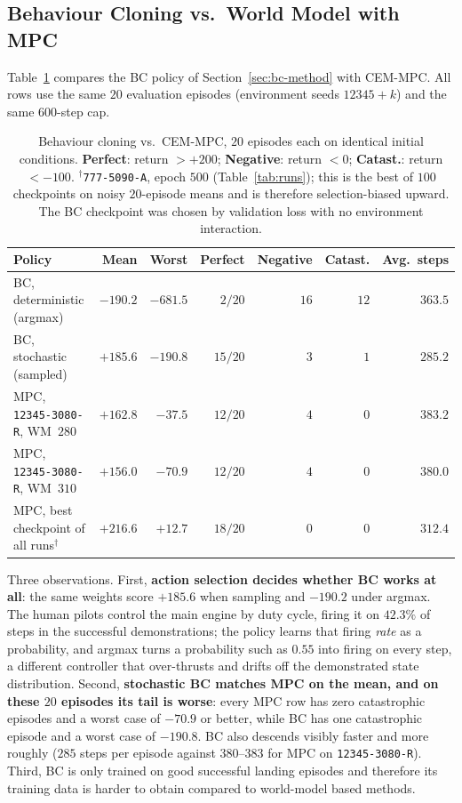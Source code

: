 \documentclass[11pt]{article}
\theoremstyle{remark}
\begin{document}
\subsection{Behaviour Cloning vs.\ World Model with MPC}
\label{sec:bc}

Table~\ref{tab:bc} compares the BC policy of Section~\ref{sec:bc-method} with CEM-MPC. All rows use the same $20$ evaluation episodes (environment seeds $12345{+}k$) and the same $600$-step cap.

\begin{table}[htbp]
\centering
\small
\begin{tabular}{@{}l r r r r r r@{}}
\toprule
\textbf{Policy} & \textbf{Mean} & \textbf{Worst} & \textbf{Perfect} & \textbf{Negative} & \textbf{Catast.} & \textbf{Avg.\ steps} \\
\midrule
BC, deterministic (argmax)             & $-190.2$ & $-681.5$ & $2/20$  & $16$ & $12$ & $363.5$ \\
BC, stochastic (sampled)               & $+185.6$ & $-190.8$ & $15/20$ & $3$  & $1$  & $285.2$ \\
MPC, \texttt{12345-3080-R}, WM~$280$      & $+162.8$ & $-37.5$  & $12/20$ & $4$  & $0$  & $383.2$ \\
MPC, \texttt{12345-3080-R}, WM~$310$ & $+156.0$ & $-70.9$ & $12/20$ & $4$ & $0$  & $380.0$ \\
MPC, best checkpoint of all runs$^\dagger$ & $+216.6$ & $+12.7$ & $18/20$ & $0$ & $0$  & $312.4$ \\
\bottomrule
\end{tabular}
\caption{Behaviour cloning vs.\ CEM-MPC, $20$ episodes each on identical initial conditions. \textbf{Perfect}: return $>+200$; \textbf{Negative}: return $<0$; \textbf{Catast.}: return $<-100$. $^\dagger$\texttt{777-5090-A}, epoch $500$ (Table~\ref{tab:runs}); this is the best of $100$ checkpoints on noisy $20$-episode means and is therefore selection-biased upward. The BC checkpoint was chosen by validation loss with no environment interaction.}
\label{tab:bc}
\end{table}

Three observations. First, \textbf{action selection decides whether BC works at all}: the same weights score $+185.6$ when sampling and $-190.2$ under argmax. The human pilots control the main engine by duty cycle, firing it on $42.3\%$ of steps in the successful demonstrations; the policy learns that firing \emph{rate} as a probability, and argmax turns a probability such as $0.55$ into firing on every step, a different controller that over-thrusts and drifts off the demonstrated state distribution. Second, \textbf{stochastic BC matches MPC on the mean, and on these $20$ episodes its tail is worse}: every MPC row has zero catastrophic episodes and a worst case of $-70.9$ or better, while BC has one catastrophic episode and a worst case of $-190.8$. BC also descends visibly faster and more roughly ($285$ steps per episode against $380$--$383$ for MPC on \texttt{12345-3080-R}). Third, BC is only trained on good successful landing episodes and therefore its training data is harder to obtain compared to world-model based methods.
\end{document}

